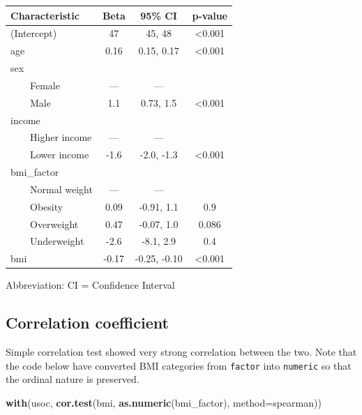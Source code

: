 \documentclass[
]{book}
\newenvironment{Shaded}{\begin{snugshade}}{\end{snugshade}}
\newcommand{\AttributeTok}[1]{\textcolor[rgb]{0.13,0.29,0.53}{#1}}
\newcommand{\FunctionTok}[1]{\textcolor[rgb]{0.13,0.29,0.53}{\textbf{#1}}}
\newcommand{\NormalTok}[1]{#1}
\newcommand{\StringTok}[1]{\textcolor[rgb]{0.31,0.60,0.02}{#1}}
\begin{document}
\begin{table}[t]
\fontsize{12.0pt}{14.0pt}\selectfont
\begin{tabular*}{\linewidth}{@{\extracolsep{\fill}}lccc}
\toprule
\textbf{Characteristic} & \textbf{Beta} & \textbf{95\% CI} & \textbf{p-value} \\ 
\midrule\addlinespace[2.5pt]
(Intercept) & 47 & 45, 48 & <0.001 \\ 
age & 0.16 & 0.15, 0.17 & <0.001 \\ 
sex &  &  &  \\ 
    Female & — & — &  \\ 
    Male & 1.1 & 0.73, 1.5 & <0.001 \\ 
income &  &  &  \\ 
    Higher income & — & — &  \\ 
    Lower income & -1.6 & -2.0, -1.3 & <0.001 \\ 
bmi\_factor &  &  &  \\ 
    Normal weight & — & — &  \\ 
    Obesity & 0.09 & -0.91, 1.1 & 0.9 \\ 
    Overweight & 0.47 & -0.07, 1.0 & 0.086 \\ 
    Underweight & -2.6 & -8.1, 2.9 & 0.4 \\ 
bmi & -0.17 & -0.25, -0.10 & <0.001 \\ 
\bottomrule
\end{tabular*}
\begin{minipage}{\linewidth}
\vspace{.05em}
Abbreviation: CI = Confidence Interval\\
\end{minipage}
\end{table}

\subsection{Correlation coefficient}\label{correlation-coefficient}

Simple correlation test showed very strong correlation between the two. Note that the code below have converted BMI categories from \texttt{factor} into \texttt{numeric} so that the ordinal nature is preserved.

\begin{Shaded}
\begin{Highlighting}[]
\FunctionTok{with}\NormalTok{(usoc, }\FunctionTok{cor.test}\NormalTok{(bmi, }\FunctionTok{as.numeric}\NormalTok{(bmi\_factor), }\AttributeTok{method=}\StringTok{\textquotesingle{}spearman\textquotesingle{}}\NormalTok{))}
\end{Highlighting}
\end{Shaded}
\end{document}
